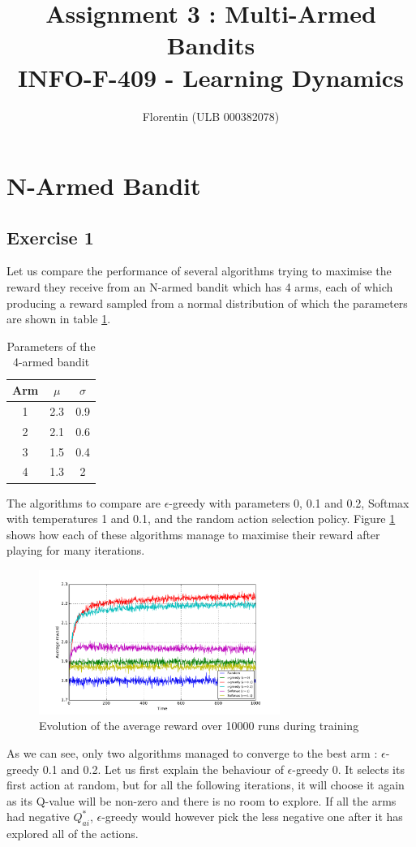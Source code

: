 \documentclass[a4paper]{article}
\title{
    Assignment 3 : Multi-Armed Bandits\\
    \small INFO-F-409 - Learning Dynamics
}
\author{Florentin \bsc{Hennecker} (ULB 000382078)}
\date{}
\begin{document}
\maketitle

\section{N-Armed Bandit}
\subsection{Exercise 1}

Let us compare the performance of several algorithms trying to maximise the
reward they receive from an N-armed bandit which has 4 arms, each of which 
producing a reward sampled from a normal distribution of which the parameters
are shown in table \ref{banditparams}.

\begin{table}[H]
\centering
\begin{tabular}{c|c|c}
	\textbf{Arm} & $\mu$ & $\sigma$ \\
	\hline
	1 & 2.3 & 0.9\\
	2 & 2.1 & 0.6\\
	3 & 1.5 & 0.4\\
	4 & 1.3 & 2\\
\end{tabular}
\caption{Parameters of the 4-armed bandit}
\label{banditparams}
\end{table}

The algorithms to compare are $\epsilon$-greedy with parameters 0, 0.1 and 0.2,
Softmax with temperatures 1 and 0.1, and the random action selection policy.
Figure \ref{ex11perf} shows how each of these algorithms manage to maximise
their reward after playing for many iterations. 
\begin{figure}[H]
	\centering
	\includegraphics[width=0.7\textwidth]{./fig/ex1-1.pdf}
	\caption{Evolution of the average reward over 10000 runs during training}
	\label{ex11perf}
\end{figure}
As we can see, only two algorithms managed to converge to the best arm : 
$\epsilon$-greedy 0.1 and 0.2. Let us first explain the behaviour of 
$\epsilon$-greedy 0. It selects its first action at random, but for all the
following iterations, it will choose it again as its Q-value will be non-zero
and there is no room to explore. If all the arms had negative $Q^*_{ai}$, 
$\epsilon$-greedy would however pick the less negative one after it has explored
all of the actions.\\
\end{document}
